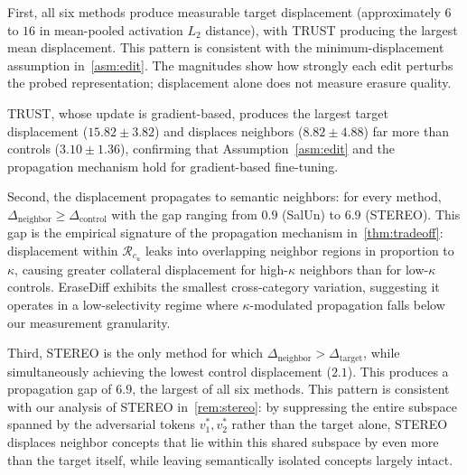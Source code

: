 First, all six methods produce measurable target displacement (approximately $6$ to $16$ in mean-pooled activation $L_2$ distance), with TRUST producing the largest mean displacement. This pattern is consistent with the minimum-displacement assumption in~\cref{asm:edit}. The magnitudes show how
strongly each edit perturbs the probed representation; displacement alone does
not measure erasure quality.

TRUST, whose update is gradient-based, produces the largest target displacement ($15.82\pm3.82$) and displaces neighbors ($8.82\pm4.88$) far more than controls ($3.10\pm1.36$), confirming that Assumption~\ref{asm:edit} and the propagation mechanism hold for gradient-based fine-tuning.


Second, the displacement propagates to semantic neighbors: for every method, $\Delta_{\mathrm{neighbor}} \geq \Delta_{\mathrm{control}}$ with the gap ranging from $0.9$ (SalUn) to $6.9$ (STEREO). This gap is the empirical signature of the propagation mechanism in~\cref{thm:tradeoff}: displacement within $\mathcal{R}_{c_u}$ leaks into overlapping neighbor regions in proportion to $\kappa$, causing greater collateral displacement for high-$\kappa$ neighbors than for low-$\kappa$ controls. EraseDiff exhibits the smallest cross-category variation, suggesting it operates in a low-selectivity regime where $\kappa$-modulated propagation falls below our measurement granularity.

Third, STEREO is the only method for which $\Delta_{\mathrm{neighbor}} > \Delta_{\mathrm{target}}$, while simultaneously achieving the lowest control displacement ($2.1$). This produces a propagation gap of $6.9$, the largest of all six methods. This pattern is consistent with our analysis of STEREO in~\cref{rem:stereo}: by suppressing the entire subspace spanned by the adversarial tokens $v_1^*, v_2^*$ rather than the target alone, STEREO displaces neighbor concepts that lie within this shared subspace by even more than the target itself, while leaving semantically isolated concepts largely intact. 

